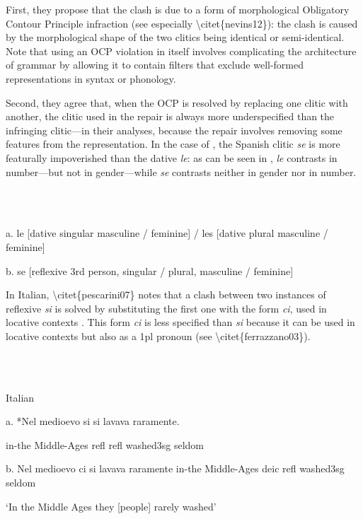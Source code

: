 \documentclass[output=paper,modfonts,nonflat]{langsci/langscibook}
\begin{document}
First, they propose that the clash is due to a form of morphological Obligatory Contour Principle infraction (see especially {\textbackslash}citet\{nevins12\}): the clash is caused by the morphological shape of the two clitics being identical or semi-identical. Note that using an OCP violation in itself involves complicating the architecture of grammar by allowing it to contain filters that exclude well-formed representations in syntax or phonology.

Second, they agree that, when the OCP is resolved by replacing one clitic with another, the clitic used in the repair is always more underspecified than the infringing clitic—in their analyses, because the repair involves removing some features from the representation. In the case of , the Spanish clitic \textit{se} is more featurally impoverished than the dative \textit{le}: as can be seen in , \textit{le} contrasts in number—but not in gender—while \textit{se} contrasts neither in gender nor in number.

\ea%
    \label{ex:key:3}
    \gll\\
        \\
    \glt
    \z

          a. le [dative singular masculine / feminine]  / les [dative   plural masculine / feminine]

  b. se [reflexive 3rd person, singular / plural, masculine /   feminine]

In Italian, {\textbackslash}citet\{pescarini07\} notes that a clash between two instances of reflexive \textit{si} is solved by substituting the first one with the form \textit{ci}, used in locative contexts . This form \textit{ci} is less specified than \textit{si} because it can be used in locative contexts but also as a 1pl pronoun (see {\textbackslash}citet\{ferrazzano03\}).

\ea%
    \label{ex:key:4}
    \gll\\
        \\
    \glt
    \z

          Italian 

  a. *Nel medioevo   si   si   lavava         raramente.

              in-the Middle-Ages refl    refl  washed3sg seldom  

  b. Nel medioevo  ci  si  lavava         raramente          in-the Middle-Ages  deic  refl  washed3sg seldom  

  ‘In the Middle Ages they [people] rarely washed’
\end{document}
